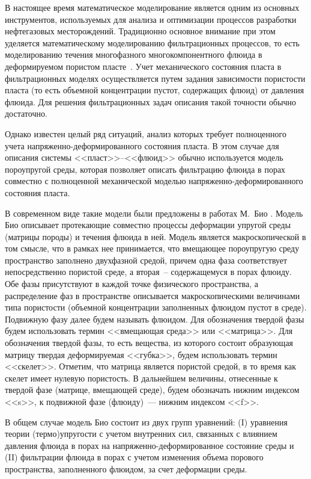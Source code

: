 %
% 
% 

В настоящее время математическое моделирование является
одним из основных инструментов, используемых для анализа и оптимизации 
процессов разработки нефтегазовых месторождений. Традиционно 
основное внимание при этом уделяется математическому моделированию
фильтрационных процессов, то есть моделированию течения многофазного
многокомпонентного флюида в деформируемом пористом пласте~\cite{aziz_2004}.
Учет механического состояния пласта в фильтрационных моделях 
осуществляется путем задания зависимости пористости пласта 
(то есть объемной концентрации пустот, содержащих флюид) от давления
флюида. Для решения фильтрационных задач описания такой точности
обычно достаточно.

Однако известен целый ряд ситуаций, анализ которых требует 
полноценного учета напряженно-деформированного состояния пласта.
В этом случае для описания системы <<пласт>>--<<флюид>>
обычно используется модель пороупругой среды,
которая позволяет описать фильтрацию флюида в порах совместно с
полноценной механической моделью напряженно-деформированного состояния пласта.

В современном виде такие модели были предложены в работах
М.~Био \cite{biot_1941}. 
Модель Био описывает протекающие совместно процессы деформации упругой
среды (матрицы породы) и течения флюида в ней.
Модель является
макроскопической в том смысле, что в рамках нее принимается,
что вмещающее пороупругую среду
пространство заполнено двухфазной средой, причем одна
фаза соответствует непосредственно пористой среде, а вторая~--
содержащемуся в порах флюиду. Обе фазы присутствуют в каждой точке
физического пространства, а распределение фаз в пространстве
описывается
макроскопическими величинами типа пористости (объемной концентрации
заполненных флюидом пустот в среде). Подвижную фазу далее будем
называть флюидом. Для обозначения твердой фазы будем  использовать
термин <<вмещающая среда>> или <<матрица>>.
Для обозначения твердой фазы, то есть вещества, из которого
состоит образующая матрицу твердая деформируемая <<губка>>,
будем использовать термин <<скелет>>. Отметим, что матрица является
пористой средой, в то время как скелет имеет нулевую пористость.
В дальнейшем величины, отнесенные к твердой фазе (матрице, вмещающей среде), будем обозначать
нижним индексом <<s>>, к подвижной фазе (флюиду)~--- нижним индексом <<f>>.

В общем случае модель Био состоит из двух групп уравнений:
(I) уравнения теории (термо)упругости с учетом внутренних сил,
связанных с влиянием давления флюида в порах на
напряженно-деформированное
состояние среды и (II) фильтрации флюида в порах с учетом изменения 
объема порового пространства, заполненного флюидом, за счет деформации среды.

